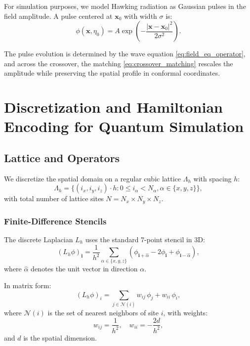 \documentclass[11pt,a4paper]{article}
\newcommand{\laph}{L_h}
\newcommand{\vecx}{\bm{x}}
\theoremstyle{plain}
\theoremstyle{definition}
\theoremstyle{remark}
\begin{document}
For simulation purposes, we model Hawking radiation as Gaussian pulses in the field amplitude. A pulse centered at $\vecx_0$ with width $\sigma$ is:
\begin{equation}\label{eq:gaussian_pulse}
    \phi(\vecx, \eta_0) = A \exp\left(-\frac{|\vecx - \vecx_0|^2}{2\sigma^2}\right).
\end{equation}

The pulse evolution is determined by the wave equation \eqref{eq:field_eq_operator}, and across the crossover, the matching \eqref{eq:crossover_matching} rescales the amplitude while preserving the spatial profile in conformal coordinates.

\section{Discretization and Hamiltonian Encoding for Quantum Simulation}\label{sec:discretization}

\subsection{Lattice and Operators}\label{subsec:lattice}

We discretize the spatial domain on a regular cubic lattice $\Lambda_h$ with spacing $h$:
\begin{equation}
    \Lambda_h = \{(i_x, i_y, i_z) \cdot h : 0 \leq i_\alpha < N_\alpha, \alpha \in \{x,y,z\}\},
\end{equation}
with total number of lattice sites $N = N_x \times N_y \times N_z$.

\subsubsection{Finite-Difference Stencils}

The discrete Laplacian $\laph$ uses the standard 7-point stencil in 3D:
\begin{equation}\label{eq:discrete_laplacian}
    (\laph \phi)_{\bm{i}} = \frac{1}{h^2}\sum_{\alpha \in \{x,y,z\}} \left(\phi_{\bm{i}+\hat{\alpha}} - 2\phi_{\bm{i}} + \phi_{\bm{i}-\hat{\alpha}}\right),
\end{equation}
where $\hat{\alpha}$ denotes the unit vector in direction $\alpha$.

In matrix form:
\begin{equation}\label{eq:Lh_matrix}
    (\laph \phi)_i = \sum_{j \in \mathcal{N}(i)} w_{ij}\,\phi_j + w_{ii}\,\phi_i,
\end{equation}
where $\mathcal{N}(i)$ is the set of nearest neighbors of site $i$, with weights:
\begin{equation}
    w_{ij} = \frac{1}{h^2}, \quad w_{ii} = -\frac{2d}{h^2},
\end{equation}
and $d$ is the spatial dimension.
\end{document}
